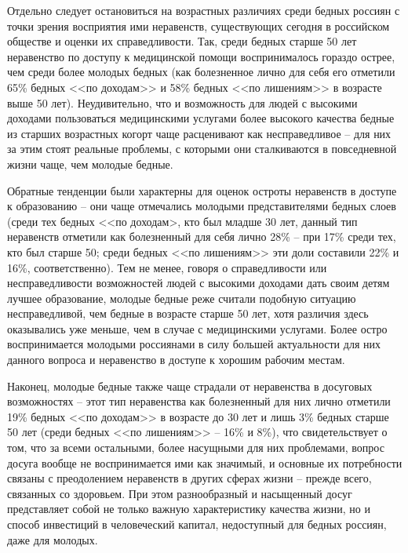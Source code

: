 Отдельно следует остановиться на возрастных различиях среди бедных россиян с 
точки зрения восприятия ими неравенств, существующих сегодня в российском 
обществе и оценки их справедливости. Так, среди бедных старше 50 лет 
неравенство по доступу к медицинской помощи воспринималось гораздо острее, 
чем среди более молодых бедных (как болезненное лично для себя его отметили 
65\% бедных <<по доходам>> и 58\% бедных <<по лишениям>> в возрасте выше 50 лет). 
Неудивительно, что и возможность для людей с высокими доходами пользоваться 
медицинскими услугами более высокого качества бедные из старших возрастных 
когорт чаще расценивают как несправедливое -- для них за этим стоят реальные 
проблемы, с которыми они сталкиваются в повседневной жизни чаще, чем молодые 
бедные.\cite{vestnik}

Обратные тенденции были характерны для оценок остроты неравенств в доступе к 
образованию -- они чаще отмечались молодыми представителями бедных слоев (среди 
тех бедных <<по доходам>, кто был младше 30 лет, данный тип неравенств отметили 
как болезненный для себя лично 28\% -- при 17\% среди тех, кто был старше 50; 
среди бедных <<по лишениям>> эти доли составили 22\% и 16\%, соответственно). 
Тем не менее, говоря о справедливости или несправедливости возможностей людей 
с высокими доходами дать своим детям лучшее образование, молодые бедные реже 
считали подобную ситуацию несправедливой, чем бедные в возрасте старше 50 лет, 
хотя различия здесь оказывались уже меньше, чем в случае с медицинскими 
услугами. Более остро воспринимается молодыми россиянами в силу большей 
актуальности для них данного вопроса и неравенство в доступе к хорошим рабочим 
местам.

Наконец, молодые бедные также чаще страдали от неравенства в досуговых 
возможностях -- этот тип неравенства как болезненный для них лично отметили 
19\% бедных <<по доходам>> в возрасте до 30 лет и лишь 3\% бедных старше 50 лет 
(среди бедных <<по лишениям>> -- 16\% и 8\%), что свидетельствует о том, что за 
всеми остальными, более насущными для них проблемами, вопрос досуга вообще не 
воспринимается ими как значимый, и основные их потребности связаны с 
преодолением неравенств в других сферах жизни -- прежде всего, связанных со 
здоровьем. При этом разнообразный и насыщенный досуг представляет собой не 
только важную характеристику качества жизни, но и способ инвестиций в 
человеческий капитал, недоступный для бедных россиян, даже для молодых.
\cite{vestnik}

